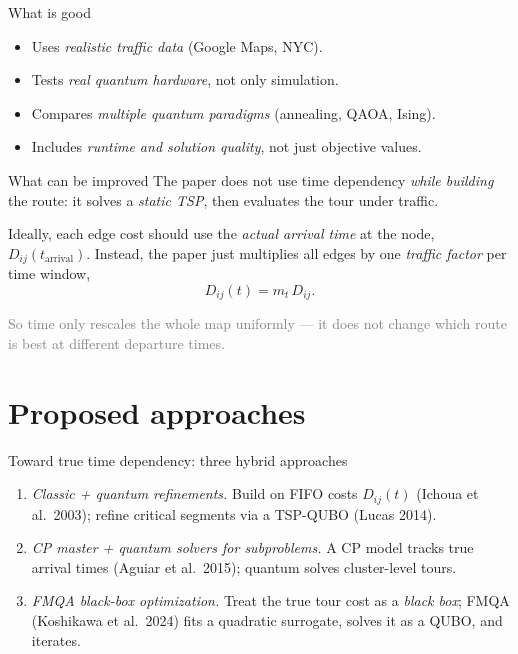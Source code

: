 \documentclass[
11pt,notheorems,hyperref={pdfauthor=Alma Arevalo Loyola}
]{beamer}
\renewcommand{\emphasize}[1]{\textcolor{emphasisblue}{\textit{#1}}}
\newcommand{\emphteal}[1]{\textcolor{emphasisteal}{\textit{#1}}}
\begin{document}
\begin{frame}{What is good}
  \begin{itemize}
    \item[\textcolor{emphasisteal}{\checkmark}] Uses \emphasize{realistic traffic data} (Google Maps, NYC).
    \item[\textcolor{emphasisteal}{\checkmark}] Tests \emphasize{real quantum hardware}, not only simulation.
    \item[\textcolor{emphasisteal}{\checkmark}] Compares \emphasize{multiple quantum paradigms} (annealing, QAOA, Ising).
    \item[\textcolor{emphasisteal}{\checkmark}] Includes \emphasize{runtime and solution quality}, not just objective values.
  \end{itemize}
\end{frame}

\begin{frame}{What can be improved}
  \small
  The paper does \alert{not} use time dependency \emphteal{while building} the route: it solves a \emphteal{static TSP}, then evaluates the tour under traffic.
  \vspace{0.4em}

  Ideally, each edge cost should use the \emphasize{actual arrival time} at the node, $D_{ij}(t_{\text{arrival}})$. Instead, the paper just multiplies all edges by one \emphasize{traffic factor} per time window,
  \[
    D_{ij}(t) = m_t \, D_{ij}.
  \]
  \vspace{0.3em}

  \textcolor{gray}{So time only rescales the whole map uniformly --- it does not change which route is best at different departure times.}
\end{frame}

\section{Proposed approaches}

\begin{frame}{Toward true time dependency: three hybrid approaches}
  \nocite{ichoua2003vehicle,lucas2014ising,kitai2020designing,koshikawa2024efficient}
  \small
  \begin{enumerate}\setlength{\itemsep}{6pt}
    \item \emphteal{Classic + quantum refinements.}
      Build on FIFO costs $D_{ij}(t)$ (Ichoua et al.\ 2003); refine critical segments via a TSP-QUBO (Lucas 2014).
    \item \emphteal{CP master + quantum solvers for subproblems.}
      A CP model tracks true arrival times (Aguiar et al.\ 2015); quantum solves cluster-level tours.
    \item \emphteal{FMQA black-box optimization.}
      Treat the true tour cost as a \emphasize{black box}; FMQA (Koshikawa et al.\ 2024) fits a quadratic surrogate, solves it as a QUBO, and iterates.
  \end{enumerate}
\end{frame}
\end{document}
